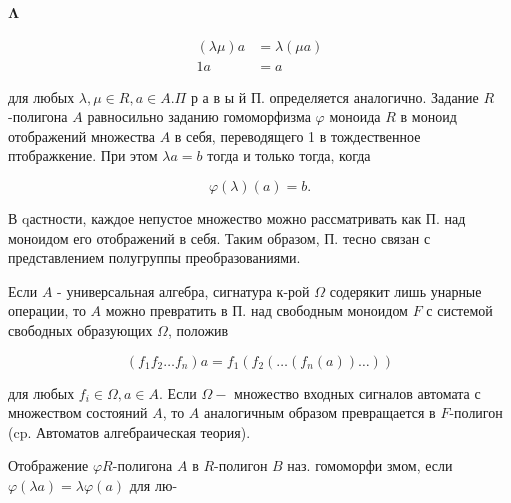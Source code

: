 \documentclass[10pt]{article}
\begin{document}
$\mathbf{\Lambda}$



\[

\begin{aligned}

(\lambda \mu) a & =\lambda(\mu a) \\

1 a & =a

\end{aligned}

\]



для любых $\lambda, \mu \in R, a \in A . \Pi$ р а в ы й П. определяется аналогично. Задание $R$-полигона $A$ равносильно заданию гомоморфизма $\varphi$ моноида $R$ в моноид отображений множества $A$ в себя, переводящего 1 в тождественное птображкение. При этом $\lambda a=b$ тогда и только тогда, когда



\[

\varphi(\lambda)(a)=b .

\]



В qастности, каждое непустое множество можно рассматривать как П. над моноидом его отображений в себя. Таким образом, П. тесно связан с представлением полугруппы преобразованиями.



Если $A$ - универсальная алгебра, сигнатура к-рой $\Omega$ содерякит лишь унарные операции, то $A$ можно превратить в П. над свободным моноидом $F$ с системой свободных образующих $\Omega$, положив



\[

\left(f_{1} f_{2} \ldots f_{n}\right) a=f_{1}\left(f_{2}\left(\ldots\left(f_{n}(a)\right) \ldots\right)\right)

\]



для любых $f_{i} \in \Omega, a \in A$. Если $\Omega-$ множество входных сигналов автомата с множеством состояний $A$, то $A$ аналогичным образом превращается в $F$-полигон (cp. Автоматов алгебраическая теория).



Отображение $\varphi R$-полигона $A$ в $R$-полигон $B$ наз. гомоморфи змом, если $\varphi(\lambda a)=\lambda \varphi(a)$ для лю-
\end{document}
